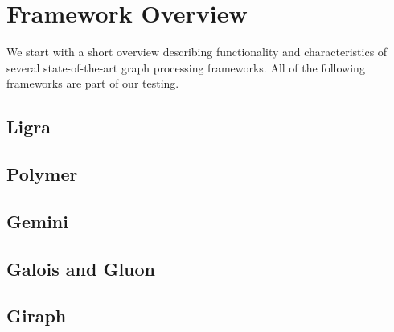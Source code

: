 
\section{Framework Overview}
We start with a short overview describing functionality and characteristics of several state-of-the-art graph processing frameworks.
All of the following frameworks are part of our testing.
\todo

\subsection{Ligra}


\subsection{Polymer}


\subsection{Gemini}


\subsection{Galois and Gluon}


\subsection{Giraph}





